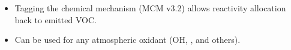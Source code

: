 \begin{BlueBox}
    \vskip-1cm
    \begin{block}{}
        \begin{itemize} 
            \item Tagging the chemical mechanism (MCM v3.2) \citep{Butler:2011} allows reactivity allocation back to emitted VOC. \vspace{13mm}
            \item Can be used for any atmospheric oxidant (OH, ,  and others).
        \end{itemize}
        \vskip3cm
        \begin{center}
            
        \end{center}
        \vskip8.5mm
    \end{block}
\end{BlueBox}
